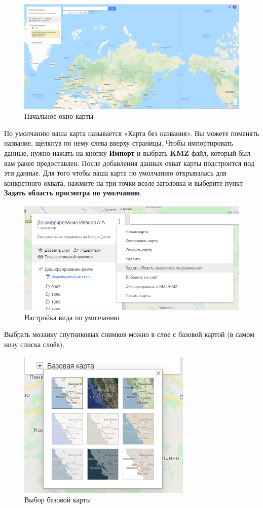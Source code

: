 \documentclass[
  12pt,
]{book}
\begin{document}
\begin{figure}
\centering
\includegraphics{images/Interpretation/Initial_view.png}
\caption{Начальное окно карты}
\end{figure}

По умолчанию ваша карта называется «Карта без названия». Вы можете поменять название, щёлкнув по нему слева вверху страницы. Чтобы импортировать данные, нужно нажать на кнопку \textbf{Импорт} и выбрать \textbf{KMZ} файл, который был вам ранее предоставлен. После добавления данных охват карты подстроится под эти данные. Для того чтобы ваша карта по умолчанию открывалась для конкретного охвата, нажмите на три точки возле заголовка и выберите пункт \textbf{Задать область просмотра по умолчанию}.

\begin{figure}
\centering
\includegraphics{images/Interpretation/Default_view.png}
\caption{Настройка вида по умолчанию}
\end{figure}

Выбрать мозаику спутниковых снимков можно в слое с базовой картой (в самом низу списка слоёв).

\begin{figure}
\centering
\includegraphics{images/Interpretation/Basemap.png}
\caption{Выбор базовой карты}
\end{figure}
\end{document}
